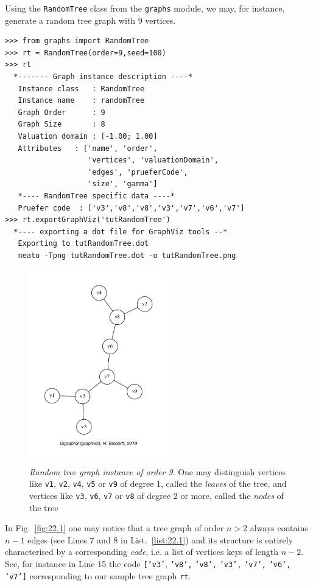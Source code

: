 Using the \texttt{RandomTree} class from the \texttt{graphs} module, we may, for instance, generate a random tree graph with 9 vertices.
\begin{lstlisting}[caption={Generating a random tree graph},label=list:22.1]
>>> from graphs import RandomTree
>>> rt = RandomTree(order=9,seed=100)
>>> rt
  *------- Graph instance description ----*
   Instance class   : RandomTree
   Instance name    : randomTree
   Graph Order      : 9
   Graph Size       : 8
   Valuation domain : [-1.00; 1.00]
   Attributes   : ['name', 'order',
                   'vertices', 'valuationDomain',
                   'edges', 'prueferCode',
                   'size', 'gamma']
   *---- RandomTree specific data ----*
   Pruefer code  : ['v3','v8','v8','v3','v7','v6','v7']
>>> rt.exportGraphViz('tutRandomTree')
  *---- exporting a dot file for GraphViz tools --*
   Exporting to tutRandomTree.dot
   neato -Tpng tutRandomTree.dot -o tutRandomTree.png
\end{lstlisting}
\begin{figure}[ht]
\sidecaption[t]
\includegraphics[width=6cm]{Figures/22-1-tutRandomTree.pdf}
\caption[Random tree graph instance of order 9]{\emph{Random tree graph instance of order 9}. One may distinguish vertices like \texttt{v1}, \texttt{v2}, \texttt{v4}, \texttt{v5} or \texttt{v9}  of degree 1, called the \emph{leaves} of the tree, and vertices like \texttt{v3}, \texttt{v6}, \texttt{v7} or \texttt{v8} of degree 2 or more, called the \emph{nodes} of the tree} 
\label{fig:22.1}       %
\end{figure}

In Fig.~\vref{fig:22.1} one may notice that a tree graph of order $n > 2$ always contains $n-1$ edges (see Lines 7 and 8 in List.~\vref{list:22.1}) and its structure is entirely characterised by a corresponding \Pruefer \emph{code}, i.e. a list of vertices keys of length $n-2$. See, for instance in Line 15 the code \texttt{['v3'}, \texttt{'v8',} \texttt{'v8',} \texttt{'v3',} \texttt{'v7',} \texttt{'v6',} \texttt{'v7']} corresponding to our sample tree graph \texttt{rt}.

